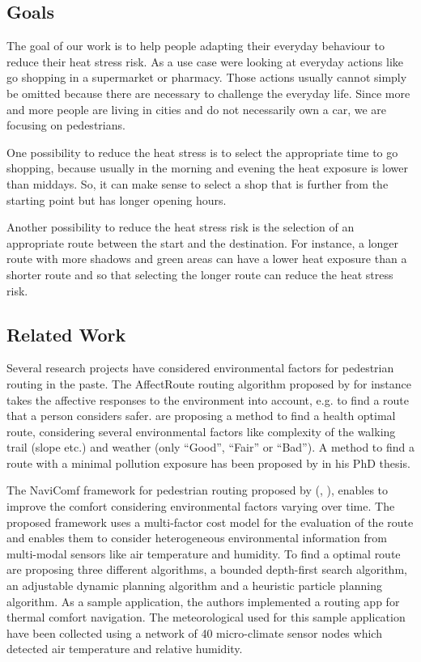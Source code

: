 \subsection{Goals}

The goal of our work is to help people adapting their everyday behaviour to reduce their heat stress risk. As a use case were looking at everyday actions like go shopping in a supermarket or pharmacy. Those actions usually cannot simply be omitted because there are necessary to challenge the everyday life. Since more and more people are living in cities and do not necessarily own a car, we are focusing on pedestrians. 

One possibility to reduce the heat stress is to select the appropriate time to go shopping, because usually in the morning and evening the heat exposure is lower than middays. So, it can make sense to select a shop that is further from the starting point but has longer opening hours.   

Another possibility to reduce the heat stress risk is the selection of an appropriate route between the start and the destination. For instance, a longer route with more shadows and green areas can have a lower heat exposure than a shorter route and so that selecting the longer route can reduce the heat stress risk. 
   
\subsection{Related Work} 

Several research projects have considered environmental factors for pedestrian routing in the paste. The AffectRoute routing algorithm proposed by \textcite{Huang2014} for instance takes the affective responses to the environment into account, e.g. to find a route that a person considers safer.  \textcite{Sharker2012} are proposing a method to find a health optimal route, considering several environmental factors like complexity of the walking trail (slope etc.) and weather (only “Good”, “Fair” or “Bad”). A method to find a route with a minimal pollution exposure has been proposed by \textcite{Hasenfratz2015} in his PhD thesis.

The NaviComf framework for pedestrian routing proposed by \citeauthor{Dang2012} (\citeyear{Dang2012}, \citeyear{Dang2013}), enables to improve the comfort considering environmental factors varying over time. The proposed framework uses a multi-factor cost model for the evaluation of the route and enables them to consider heterogeneous environmental information from multi-modal
 sensors like air temperature and humidity. To find a optimal route \textcite{Dang2013} are proposing three different algorithms,  a bounded depth-first search algorithm, an adjustable dynamic planning algorithm and a heuristic particle planning algorithm. As a sample application, the authors implemented a routing app for thermal comfort navigation. The meteorological used for this sample application have been collected using a network of 40 micro-climate sensor nodes which detected air temperature and relative humidity. 

